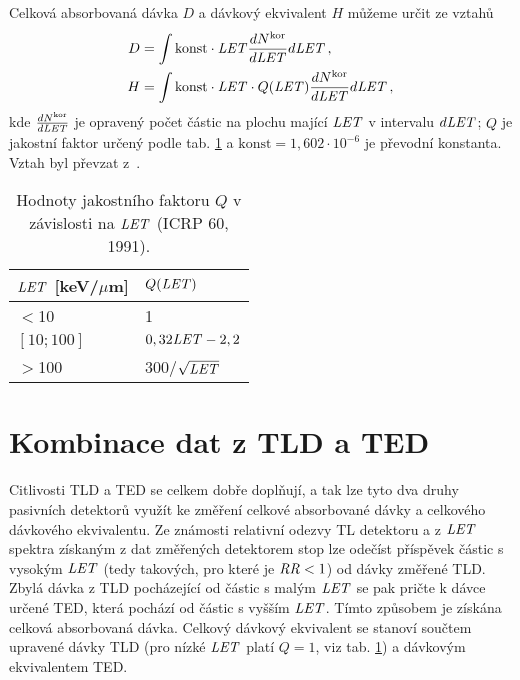 Celková absorbovaná dávka $D$ a dávkový ekvivalent $H$ můžeme určit ze vztahů 
\begin{align}
  D&=\int\text{konst}\cdot\mathit{LET}\frac{dN^{\text{kor}}}{d\mathit{LET}}d\mathit{LET}\,,\label{eq:Davka}\\
  H&=\int\text{konst}\cdot\mathit{LET}\cdot Q(\mathit{LET})\frac{dN^{\text{kor}}}{d\mathit{LET}}d\mathit{LET}\,,\label{eq:EkvDavka}
\end{align}
kde $\frac{dN^{\text{kor}}}{d\mathit{LET}}$ je opravený počet částic na plochu mající $\mathit{LET}$ v intervalu $d\mathit{LET}$; $Q$ je jakostní faktor určený podle tab. \ref{tab:detektory_Q} a $\text{konst}=1,602\cdot 10^{-6}$ je převodní konstanta. Vztah byl převzat z~\cite{thesisKPBrabcova}.

\begin{table}[H]
  \centering
  \caption{Hodnoty jakostního faktoru $Q$ v závislosti na $\mathit{LET}$ (ICRP 60, 1991).}
  \label{tab:detektory_Q}
  \begin{tabular}{ll}
	\toprule
	$\mathit{LET}$ [keV/$\mu$m]&$Q(\mathit{LET})$ \\
	\midrule
$<$10&1\\
$[10;100]$&$0,32\mathit{LET}-2,2$\\
$>$100&300/$\sqrt{\mathit{LET}}$\\
	\bottomrule
  \end{tabular}
\end{table}
\section{Kombinace dat z TLD a TED}\label{sec:detektory_kombinace}
Citlivosti TLD a TED se celkem dobře doplňují, a tak lze tyto dva druhy pasivních detektorů využít ke změření celkové absorbované dávky a celkového dávkového ekvivalentu. Ze známosti relativní odezvy TL detektoru a z $\mathit{LET}$ spektra získaným z dat změřených detektorem stop lze odečíst příspěvek částic s vysokým $\mathit{LET}$ (tedy takových, pro které je $\mathit{RR}<1$) od dávky změřené TLD. Zbylá dávka z TLD pocházející od částic s malým $\mathit{LET}$ se pak pričte k dávce určené TED, která pochází od částic s vyšším $\mathit{LET}$. Tímto způsobem je získána celková absorbovaná dávka. Celkový dávkový ekvivalent se stanoví součtem upravené dávky TLD (pro nízké $\mathit{LET}$ platí $Q=1$, viz tab. \ref{tab:detektory_Q}) a dávkovým ekvivalentem TED.~\cite{dataTLD_RR}







